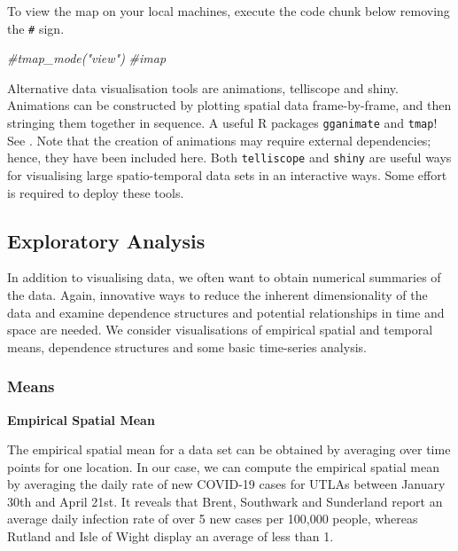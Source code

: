 \documentclass[
]{book}
\newenvironment{Shaded}{\begin{snugshade}}{\end{snugshade}}
\newcommand{\CommentTok}[1]{\textcolor[rgb]{0.56,0.35,0.01}{\textit{#1}}}
\begin{document}
To view the map on your local machines, execute the code chunk below removing the \texttt{\#} sign.

\begin{Shaded}
\begin{Highlighting}[]
\CommentTok{\#tmap\_mode("view")}
\CommentTok{\#imap}
\end{Highlighting}
\end{Shaded}

Alternative data visualisation tools are animations, telliscope and shiny. Animations can be constructed by plotting spatial data frame-by-frame, and then stringing them together in sequence. A useful R packages \texttt{gganimate} and \texttt{tmap}! See \citet{Lovelace_et_al_2020_book}. Note that the creation of animations may require external dependencies; hence, they have been included here. Both \texttt{telliscope} and \texttt{shiny} are useful ways for visualising large spatio-temporal data sets in an interactive ways. Some effort is required to deploy these tools.

\hypertarget{exploratory-analysis-1}{%
\subsection{Exploratory Analysis}\label{exploratory-analysis-1}}

In addition to visualising data, we often want to obtain numerical summaries of the data. Again, innovative ways to reduce the inherent dimensionality of the data and examine dependence structures and potential relationships in time and space are needed. We consider visualisations of empirical spatial and temporal means, dependence structures and some basic time-series analysis.

\hypertarget{means}{%
\subsubsection{Means}\label{means}}

\textbf{Empirical Spatial Mean}

The empirical spatial mean for a data set can be obtained by averaging over time points for one location. In our case, we can compute the empirical spatial mean by averaging the daily rate of new COVID-19 cases for UTLAs between January 30th and April 21st. It reveals that Brent, Southwark and Sunderland report an average daily infection rate of over 5 new cases per 100,000 people, whereas Rutland and Isle of Wight display an average of less than 1.
\end{document}
